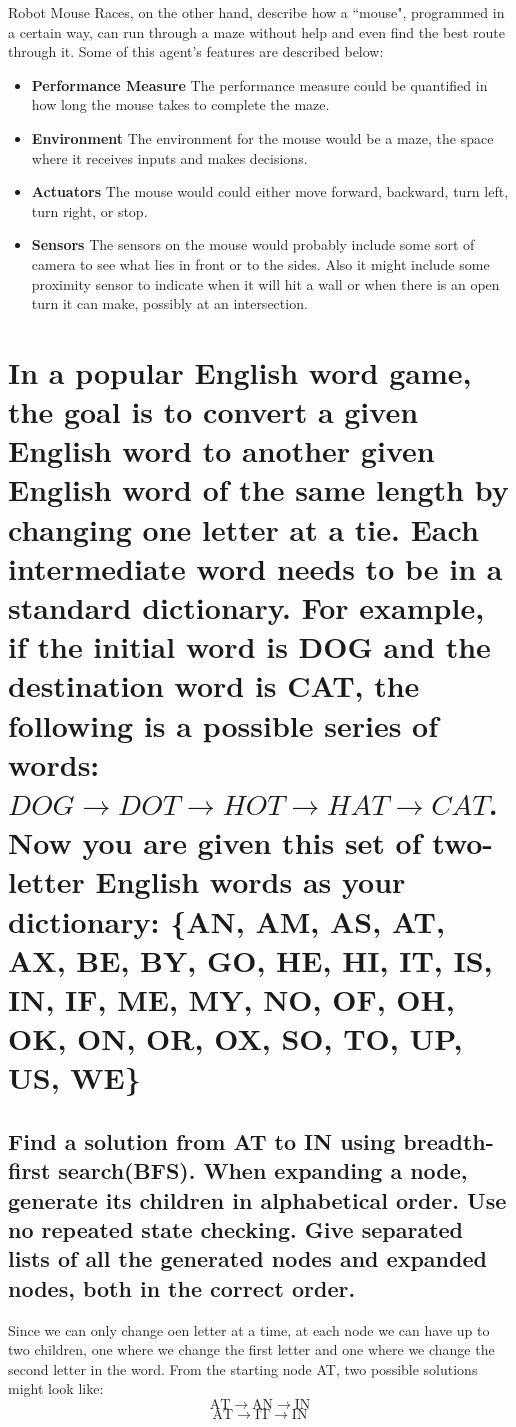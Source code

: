 \documentclass{article}
\begin{document}
Robot Mouse Races, on the other hand, describe how a ``mouse", programmed in a certain way, can run through 
a maze without help and even find the best route through it.  Some of this agent's features are described below:

\begin{itemize}
	\item \textbf{Performance Measure} The performance measure could be quantified in how long the mouse takes to 
			complete the maze. 
	\item \textbf{Environment} The environment for the mouse would be a maze, the space where it receives inputs
			and makes decisions.
	\item \textbf{Actuators} The mouse would could either move forward, backward, turn left, turn right,
			or stop. 
	\item \textbf{Sensors} The sensors on the mouse would probably include some sort of camera to see what lies
			in front or to the sides. Also it might include some proximity sensor to indicate when it will
			hit a wall or when there is an open turn it can make, possibly at an intersection.
\end{itemize}

\section{In a popular English word game, the goal is to convert a given English word to another given English
word of the same length by changing one letter at a tie. Each intermediate word needs to be in a standard 
dictionary. For example, if the initial word is DOG and the destination word is CAT, the following is a possible
series of words: $DOG\rightarrow DOT\rightarrow HOT\rightarrow HAT \rightarrow CAT$. 
Now you are given this set of two-letter English words as your 
dictionary: \{AN, AM, AS, AT, AX, BE, BY, GO, HE, HI, IT, IS, IN, IF, ME, MY, NO, OF, OH, OK, ON, OR,
OX, SO, TO, UP, US, WE\}}
	\subsection{Find a solution from AT to IN using breadth-first search(BFS). When expanding a node,
		generate its children in alphabetical order. Use no repeated state checking. Give separated lists of 
		all the generated nodes and expanded nodes, both in the correct order.}
		\label{subsec:bfs}
		Since we can only change oen letter at a time, at each node we can have up to two children, 
		one where we change the first letter and one where we change the second letter in the word.	From the 
		starting node AT, two possible solutions might look like: 
		\[ \textrm{AT} \rightarrow \textrm{AN} \rightarrow \textrm{IN}\]
		\[ \textrm{AT} \rightarrow \textrm{IT} \rightarrow \textrm{IN}\]
\end{document}
